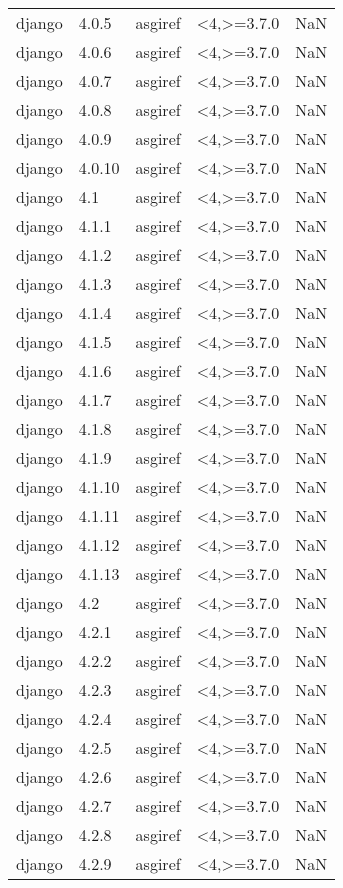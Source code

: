 \begin{tabular}{llllr}
django & 4.0.5 & asgiref & <4,>=3.7.0 & NaN \\
django & 4.0.6 & asgiref & <4,>=3.7.0 & NaN \\
django & 4.0.7 & asgiref & <4,>=3.7.0 & NaN \\
django & 4.0.8 & asgiref & <4,>=3.7.0 & NaN \\
django & 4.0.9 & asgiref & <4,>=3.7.0 & NaN \\
django & 4.0.10 & asgiref & <4,>=3.7.0 & NaN \\
django & 4.1 & asgiref & <4,>=3.7.0 & NaN \\
django & 4.1.1 & asgiref & <4,>=3.7.0 & NaN \\
django & 4.1.2 & asgiref & <4,>=3.7.0 & NaN \\
django & 4.1.3 & asgiref & <4,>=3.7.0 & NaN \\
django & 4.1.4 & asgiref & <4,>=3.7.0 & NaN \\
django & 4.1.5 & asgiref & <4,>=3.7.0 & NaN \\
django & 4.1.6 & asgiref & <4,>=3.7.0 & NaN \\
django & 4.1.7 & asgiref & <4,>=3.7.0 & NaN \\
django & 4.1.8 & asgiref & <4,>=3.7.0 & NaN \\
django & 4.1.9 & asgiref & <4,>=3.7.0 & NaN \\
django & 4.1.10 & asgiref & <4,>=3.7.0 & NaN \\
django & 4.1.11 & asgiref & <4,>=3.7.0 & NaN \\
django & 4.1.12 & asgiref & <4,>=3.7.0 & NaN \\
django & 4.1.13 & asgiref & <4,>=3.7.0 & NaN \\
django & 4.2 & asgiref & <4,>=3.7.0 & NaN \\
django & 4.2.1 & asgiref & <4,>=3.7.0 & NaN \\
django & 4.2.2 & asgiref & <4,>=3.7.0 & NaN \\
django & 4.2.3 & asgiref & <4,>=3.7.0 & NaN \\
django & 4.2.4 & asgiref & <4,>=3.7.0 & NaN \\
django & 4.2.5 & asgiref & <4,>=3.7.0 & NaN \\
django & 4.2.6 & asgiref & <4,>=3.7.0 & NaN \\
django & 4.2.7 & asgiref & <4,>=3.7.0 & NaN \\
django & 4.2.8 & asgiref & <4,>=3.7.0 & NaN \\
django & 4.2.9 & asgiref & <4,>=3.7.0 & NaN \\

\end{tabular}
